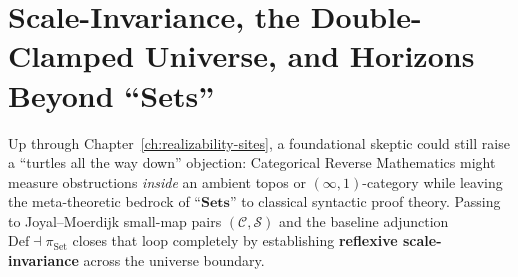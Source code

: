 \section{\texorpdfstring{Scale-Invariance, the Double-Clamped Universe, and Horizons Beyond ``$\mathbf{Sets}$''}{Scale-Invariance, the Double-Clamped Universe, and Horizons Beyond "Sets"}}\label{sec:scale-invariance-synthesis}

Up through Chapter~\ref{ch:realizability-sites}, a foundational skeptic could still raise a ``turtles all the way down'' objection: Categorical Reverse Mathematics might measure obstructions \emph{inside} an ambient topos or $(\infty, 1)$-category while leaving the meta-theoretic bedrock of ``$\mathbf{Sets}$'' to classical syntactic proof theory. Passing to Joyal--Moerdijk small-map pairs $(\mathcal{C}, \mathcal{S})$ and the baseline adjunction $\mathrm{Def} \dashv \pi_{\mathrm{Set}}$ closes that loop completely by establishing \textbf{reflexive scale-invariance} across the universe boundary.

